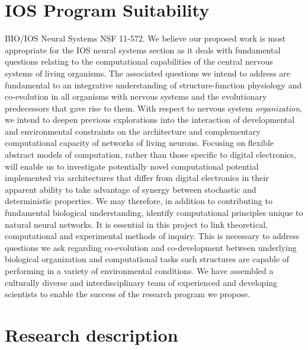 \section{IOS Program Suitability}
\label{sec:justification}
\noindent BIO/IOS Neural Systems NSF 11-572. We believe our proposed work is most appropriate for the IOS neural systems section as it deals with fundamental questions relating to the computational capabilities of the central nervous systems of living organisms. The associated questions we intend to address are fundamental to an integrative understanding of structure-function physiology and co-evolution in all organisms with nervous systems and the evolutionary predecessors that gave rise to them. With respect to nervous system \emph{organization}, we intend to deepen previous explorations into the interaction of developmental and environmental constraints on the architecture and complementary computational capacity of networks of living neurons. Focusing on flexible abstract models of computation, rather than those specific to digital electronics, will enable us to investigate potentially novel computational potential implemented via architectures that differ from digital electronics in their apparent ability to take advantage of synergy between stochastic and deterministic properties. We may therefore, in addition to contributing to fundamental biological understanding, identify computational principles unique to natural neural networks. It is essential in this project to link theoretical, computational and experimental methods of inquiry. This is necessary to address questions we ask regarding co-evolution and co-development between underlying biological organization and computational tasks such structures are capable of performing in a variety of environmental conditions. We have assembled a culturally diverse and interdisciplinary team of experienced and developing scientists to enable the success of the research program we propose.

\section{Research description}

